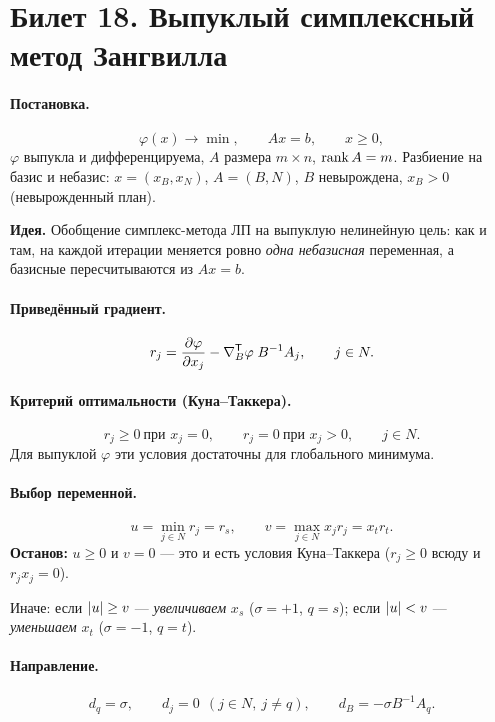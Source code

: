 \section{Билет 18. Выпуклый симплексный метод Зангвилла}


\paragraph{Постановка.}
\[
  \varphi(x) \to \min , \qquad Ax = b , \qquad x \ge 0 ,
\]
$\varphi$ выпукла и дифференцируема, $A$ размера $m \times n$,
$\operatorname{rank} A = m$. Разбиение на базис и небазис: $x = (x_B, x_N)$, $A = (B, N)$,
$B$ невырождена, $x_B > 0$ (невырожденный план).

\textbf{Идея.} Обобщение симплекс-метода ЛП на выпуклую нелинейную цель: как и
там, на каждой итерации меняется ровно \emph{одна небазисная} переменная, а
базисные пересчитываются из $Ax = b$.

\paragraph{Приведённый градиент.}
\[
  r_j = \frac{\partial\varphi}{\partial x_j}
      - \nabla_B^{\mathsf{T}}\varphi\; B^{-1}A_j , \qquad j \in N .
\]

\paragraph{Критерий оптимальности (Куна--Таккера).}
\[
  r_j \ge 0 \ \text{при } x_j = 0 ,
  \qquad
  r_j = 0 \ \text{при } x_j > 0 ,
  \qquad j \in N .
\]
Для выпуклой $\varphi$ эти условия достаточны для глобального минимума.

\paragraph{Выбор переменной.}
\[
  u = \min_{j \in N} r_j = r_s ,
  \qquad
  v = \max_{j \in N} x_j r_j = x_t r_t .
\]
\textbf{Останов:} $u \ge 0$ и $v = 0$ — это и есть условия Куна--Таккера
($r_j \ge 0$ всюду и $r_jx_j = 0$).

Иначе: если $\left\lvert u \right\rvert \ge v$ — \emph{увеличиваем} $x_s$ ($\sigma = +1$, $q = s$);
если $\left\lvert u \right\rvert < v$ — \emph{уменьшаем} $x_t$ ($\sigma = -1$, $q = t$).

\paragraph{Направление.}
\[
  d_q = \sigma , \qquad d_j = 0 \ \ (j \in N,\ j \ne q) ,
  \qquad d_B = -\sigma B^{-1}A_q .
\]

